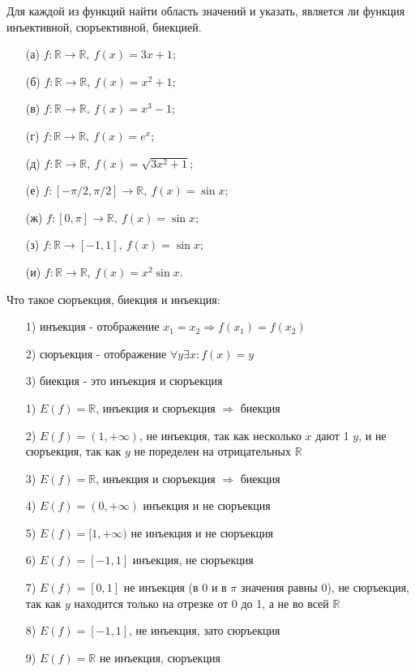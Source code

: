 \documentclass{article}
\begin{document}
\begin{task}[2]
Для каждой из функций найти область значений и указать, является ли функция инъективной, сюръективной, биекцией.
\begin{enumerate}
    \item[(а)] $f : \mathbb{R} \to \mathbb{R},\ f(x) = 3x + 1$;
    \item[(б)] $f : \mathbb{R} \to \mathbb{R},\ f(x) = x^2 + 1$;
    \item[(в)] $f : \mathbb{R} \to \mathbb{R},\ f(x) = x^3 - 1$;
    \item[(г)] $f : \mathbb{R} \to \mathbb{R},\ f(x) = e^x$;
    \item[(д)] $f : \mathbb{R} \to \mathbb{R},\ f(x) = \sqrt{3x^2 + 1}$;
    \item[(е)] $f : [-\pi/2, \pi/2] \to \mathbb{R},\ f(x) = \sin x$;
    \item[(ж)] $f : [0, \pi] \to \mathbb{R},\ f(x) = \sin x$;
    \item[(з)] $f : \mathbb{R} \to [-1, 1],\ f(x) = \sin x$;
    \item[(и)] $f : \mathbb{R} \to \mathbb{R},\ f(x) = x^2 \sin x$.
\end{enumerate}
\end{task}

\begin{solution}[4]
Что такое сюръекция, биекция и инъекция:
\begin{enumerate}
\item[1)] инъекция - отображение $x_1 = x_2 \Rightarrow f(x_1) = f(x_2)$
\item[2)] сюръекция - отображение $\forall y \exists x: f(x) = y$
\item[3)] биекция - это инъекция и сюръекция
\end{enumerate}
\begin{enumerate}
\item[1)] $E(f)=\mathbb{R}$, инъекция и сюръекция $\Rightarrow$ биекция
\item[2)] $E(f)=(1, +\infty)$, не инъекция, так как несколько $x$ дают 1 $y$, и не сюръекция, так как $y$ не поределен на отрицательных $\mathbb{R}$
\item[3)] $E(f)=\mathbb{R}$, инъекция и сюръекция $\Rightarrow$ биекция
\item[4)] $E(f)=(0, +\infty)$ инъекция и не сюръекция
\item[5)] $E(f)=[1, +\infty)$ не инъекция и не сюръекция
\item[6)] $E(f)=[-1, 1]$ инъекция, не сюръекция
\item[7)] $E(f)=[0, 1]$ не инъекция (в 0 и в $\pi$ значения равны 0), не сюръекция, так как $y$ находится только на отрезке от 0 до 1, а не во всей $\mathbb{R}$ 
\item[8)] $E(f)=[-1, 1]$, не инъекция, зато сюръекция
\item[9)] $E(f)=\mathbb{R}$ не инъекция, сюръекция
\end{enumerate}
\end{solution}
\end{document}
